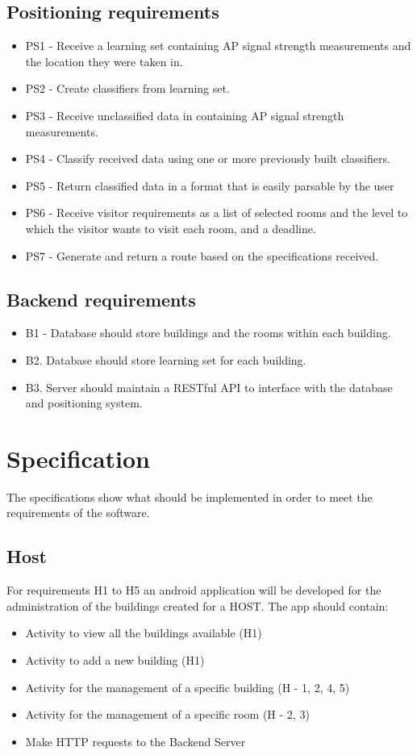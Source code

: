 \subsection{Positioning requirements}
	\begin{itemize}
		\item PS1 - Receive a learning set containing AP signal strength measurements and the 	location they were taken in.
		\item PS2 - Create classifiers from learning set.
		\item PS3 - Receive unclassified data in containing AP signal strength measurements.
		\item PS4 - Classify received data using one or more previously built classifiers.
		\item PS5 - Return classified data in a format that is easily parsable by the user
		\item PS6 - Receive visitor requirements as a list of selected rooms and the level to which the visitor wants to visit each room, and a deadline.
		\item PS7 - Generate and return a route based on the specifications received.
	\end{itemize}

\subsection{Backend requirements}
	\begin{itemize}
		\item B1 - Database should store buildings and the rooms within each building. 
		\item B2. Database should store learning set for each building.
		\item B3. Server should maintain a RESTful API to interface with the database and positioning 			system.
	\end{itemize}


\section{Specification}
The specifications show what should be implemented in order to meet the requirements of the software.

\subsection{Host}
For requirements H1 to H5 an android application will be developed for the administration of the buildings created for a HOST. The app should contain:
	\begin{itemize}
		\item Activity to view all the buildings available (H1)
		\item Activity to add a new building (H1)
		\item Activity for the management of a specific building (H - 1, 2, 4, 5)
		\item Activity for the management of a specific room (H - 2, 3)
		\item Make HTTP requests to the Backend Server
	\end{itemize}

